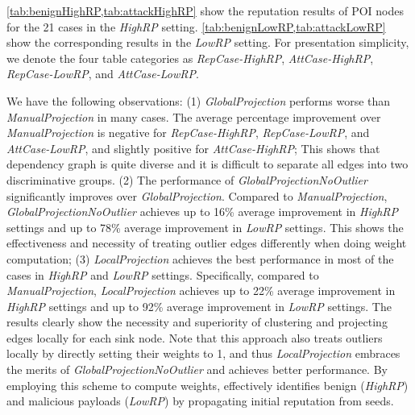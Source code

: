 \cref{tab:benignHighRP,tab:attackHighRP} show the reputation results of POI nodes for the 21 cases in the \emph{HighRP} setting.
\cref{tab:benignLowRP,tab:attackLowRP} show the corresponding results
in the \emph{LowRP} setting.
For presentation simplicity, we denote the four table categories as \emph{RepCase-HighRP}, \emph{AttCase-HighRP}, \emph{RepCase-LowRP}, and \emph{AttCase-LowRP}.

We have the following observations:
(1) \emph{GlobalProjection} performs worse than \emph{ManualProjection} in many cases. The average percentage improvement over \emph{ManualProjection} is negative for \emph{RepCase-HighRP}, \emph{RepCase-LowRP}, and \emph{AttCase-LowRP}, and slightly positive for \emph{AttCase-HighRP};
This shows that dependency graph is quite diverse and it is difficult to separate all edges into two discriminative groups.
(2) The performance of \emph{GlobalProjectionNoOutlier} significantly improves over \emph{GlobalProjection}.
Compared to \emph{ManualProjection}, \emph{GlobalProjectionNoOutlier} achieves up to 16\% average improvement in \emph{HighRP} settings and up to 78\% average improvement in \emph{LowRP} settings. This shows the effectiveness and necessity of treating outlier edges differently when doing weight computation;
(3) \emph{LocalProjection} achieves the best performance in most of the cases in \emph{HighRP} and \emph{LowRP} settings. Specifically, compared to \emph{ManualProjection}, \emph{LocalProjection} achieves up to 22\% average improvement in \emph{HighRP} settings and up to 92\% average improvement in \emph{LowRP} settings. 
The results clearly show the necessity and superiority of clustering and projecting edges locally for each sink node.
Note that this approach also treats outliers locally by directly setting their weights to 1, and thus \emph{LocalProjection} embraces the merits of \emph{GlobalProjectionNoOutlier} and achieves better performance.
By employing this scheme to compute weights, \tool effectively identifies benign (\emph{HighRP}) and malicious payloads (\emph{LowRP}) by propagating initial reputation from seeds.








